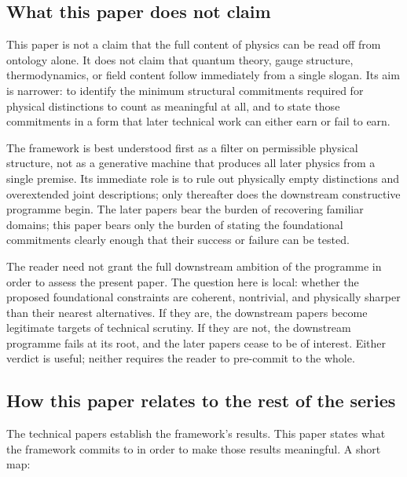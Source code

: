 \documentclass[11pt]{article}
\begin{document}
\subsection*{What this paper does not claim}

This paper is not a claim that the full content of physics can be read off from ontology alone. It does not claim that quantum theory, gauge structure, thermodynamics, or field content follow immediately from a single slogan. Its aim is narrower: to identify the minimum structural commitments required for physical distinctions to count as meaningful at all, and to state those commitments in a form that later technical work can either earn or fail to earn.

The framework is best understood first as a filter on permissible physical structure, not as a generative machine that produces all later physics from a single premise. Its immediate role is to rule out physically empty distinctions and overextended joint descriptions; only thereafter does the downstream constructive programme begin. The later papers bear the burden of recovering familiar domains; this paper bears only the burden of stating the foundational commitments clearly enough that their success or failure can be tested.

The reader need not grant the full downstream ambition of the programme in order to assess the present paper. The question here is local: whether the proposed foundational constraints are coherent, nontrivial, and physically sharper than their nearest alternatives. If they are, the downstream papers become legitimate targets of technical scrutiny. If they are not, the downstream programme fails at its root, and the later papers cease to be of interest. Either verdict is useful; neither requires the reader to pre-commit to the whole.

\subsection*{How this paper relates to the rest of the series}

The technical papers establish the framework's results. This paper states what the framework commits to in order to make those results meaningful. A short map:
\end{document}
